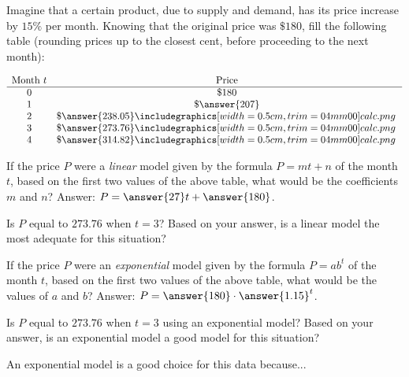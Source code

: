 \documentclass{ximera}
\author{Ivo Terek}
\begin{document}
\begin{exercise}
  Imagine that a certain product, due to supply and demand, has its price increase by $15\%$ per month. Knowing that the original price was $\$180$, fill the following table (rounding prices up to the closest cent, before proceeding to the next month):

  $$
\begin{array}{cc}
\text{Month } t& \text{Price}\\
\hline
0 & \${180}\\
1& \$\answer{207}\\
2&\$\answer{238.05}\calcHW \\
3&\$\answer{273.76}\calcHW \\
4&\$\answer{314.82}\calcHW
\end{array}
$$

\begin{exercise}
  If the price $P$ were a \emph{linear} model given by the formula $P = mt+n$ of the month $t$, based on the first two values of the above table, what would be the coefficients $m$ and $n$? Answer: $P = \answer{27}t+\answer{180}$.

  \begin{exercise}
    Is $P$ equal to $273.76$ when $t=3$? Based on your answer, is a linear model the most adequate for this situation?
    \begin{multipleChoice}
    \end{multipleChoice}
 
\begin{exercise}
  If the price $P$ were an \emph{exponential} model given by the formula $P = ab^t$ of the month $t$, based on the first two values of the above table, what would be the values of $a$ and $b$? Answer: $P = \answer{180} \cdot \answer{1.15}^t$.

  \begin{exercise}
    Is $P$ equal to $273.76$ when $t=3$ using an exponential model?  Based on your answer, is an exponential model a good model for this situation?
    \begin{multipleChoice}
    \end{multipleChoice}
 
\begin{exercise}
 An exponential model is a good choice for this data because...
    \begin{multipleChoice}
    \end{multipleChoice}
 




\end{exercise}
\end{exercise}
\end{exercise}
\end{exercise}
\end{exercise}
\end{exercise}
\end{document}

